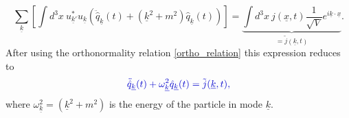\documentclass[12pt, titlepage]{article}
\begin{document}
\begin{equation}
 \sum_{\underline{k}}
 \left[ 
 \int d^{3}x \ u^{\ast}_{\underline{k}'}u_{\underline{k}}
 \left( 
 \ddot{\hat{q}}_{\underline{k}}(t) 
 +
 \left( \underline{k}^{2}+m^{2}\right) 
 \hat{q}_{\underline{k}}(t) 
 \right) 
  \right] 
  ={\underbrace{\int d^{3}x \ 
j(\underline{x},t) \dfrac{1}{\sqrt{V}} e^{i\underline{k}\cdot\underline{x}}}_{=\tilde{j}(\underline{k},t)}}
  .
\end{equation}
After using the orthonormality relation \eqref{ortho_relation} this expression reduces to
\begin{equation}\label{eq_for_q}
 \textcolor[RGB]{0,0,204}{
\ddot{\hat{q}}_{\underline{k}}(t) 
 +
\omega_{\underline{k}}^{2}
 \hat{q}_{\underline{k}}(t) 
  =\tilde{j}(\underline{k},t)
  ,}
\end{equation}
where  $ \omega_{\underline{k}}^{2} = (\underline{k}^{2}+m^{2})  $ is the energy of the particle in mode $ \underline{k} $.
\end{document}
